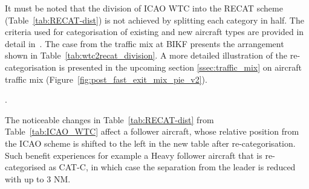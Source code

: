 It must be noted that the division of ICAO WTC into the RECAT scheme (Table~\ref{tab:RECAT-dist}) is not achieved by splitting each category in half.
The criteria used for categorisation of existing and new aircraft types are provided in detail in~\cite{rooseleer2015recat}. The case from the traffic mix at BIKF presents the arrangement shown in Table~\ref{tab:wtc2recat_division}. A more detailed illustration of the re-categorisation is presented in the upcoming section \ref{ssec:traffic_mix} on aircraft traffic mix (Figure~\ref{fig:post_fast_exit_mix_pie_v2}).

\begin{table}[h]
\centering
{}
\caption[Transition from ICAO WTC to RECAT-EU categories]{Transition from ICAO WTC to RECAT-EU categories. The categorisation process and criteria for assigning an existing aircraft type into RECAT-EU scheme is illustrated in detail in~\cite{rooseleer2015recat}}.
\label{tab:wtc2recat_division}
\end{table}

The noticeable changes in Table~\ref{tab:RECAT-dist} from Table~\ref{tab:ICAO_WTC} affect a follower aircraft, whose relative position from the ICAO scheme is shifted to the left in the new table after re-categorisation. Such benefit experiences for example a Heavy follower aircraft that is re-categorised as CAT-C, in which case the separation from the leader is reduced with up to 3 NM. 


